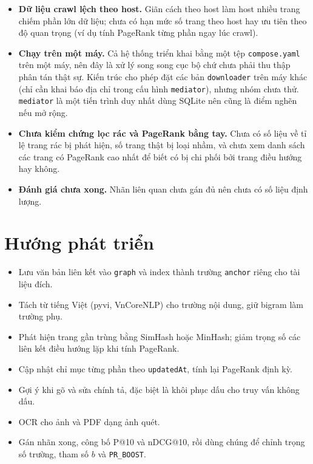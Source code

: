 \documentclass[12pt,a4paper]{report}
\begin{document}
\begin{itemize}
  \item \textbf{Dữ liệu crawl lệch theo host.} Giãn cách theo host làm host nhiều trang chiếm phần lớn dữ liệu; chưa có
        hạn mức số trang theo host hay ưu tiên theo độ quan trọng (ví dụ tính PageRank từng phần ngay lúc crawl).
  \item \textbf{Chạy trên một máy.} Cả hệ thống triển khai bằng một tệp \texttt{compose.yaml} trên một máy, nên đây là xử lý song song cục bộ chứ chưa phải thu thập phân tán thật sự. Kiến trúc cho phép đặt các bản \texttt{downloader} trên máy khác (chỉ cần khai báo địa chỉ trong cấu hình \texttt{mediator}), nhưng nhóm chưa thử. \texttt{mediator} là một tiến trình duy nhất dùng SQLite nên cũng là điểm nghẽn nếu mở rộng.
  \item \textbf{Chưa kiểm chứng lọc rác và PageRank bằng tay.} Chưa có số liệu về tỉ lệ trang rác bị phát hiện, số trang thật bị loại nhầm, và chưa xem danh sách các trang có PageRank cao nhất để biết có bị chi phối bởi trang điều hướng hay không.
  \item \textbf{Đánh giá chưa xong.} Nhãn liên quan chưa gán đủ nên chưa có số liệu định lượng.
\end{itemize}

\section{Hướng phát triển}

\begin{itemize}
  \item Lưu văn bản liên kết vào \texttt{graph} và index thành trường \texttt{anchor} riêng cho tài liệu đích.
  \item Tách từ tiếng Việt (pyvi, VnCoreNLP) cho trường nội dung, giữ bigram làm trường phụ.
  \item Phát hiện trang gần trùng bằng SimHash hoặc MinHash; giảm trọng số các liên kết điều hướng lặp khi tính PageRank.
  \item Cập nhật chỉ mục từng phần theo \texttt{updatedAt}, tính lại PageRank định kỳ.
  \item Gợi ý khi gõ và sửa chính tả, đặc biệt là khôi phục dấu cho truy vấn không dấu.
  \item OCR cho ảnh và PDF dạng ảnh quét.
  \item Gán nhãn xong, công bố P@10 và nDCG@10, rồi dùng chúng để chỉnh trọng số trường, tham số $b$ và
        \texttt{PR\_\allowbreak{}BOOST}.
\end{itemize}
\end{document}

